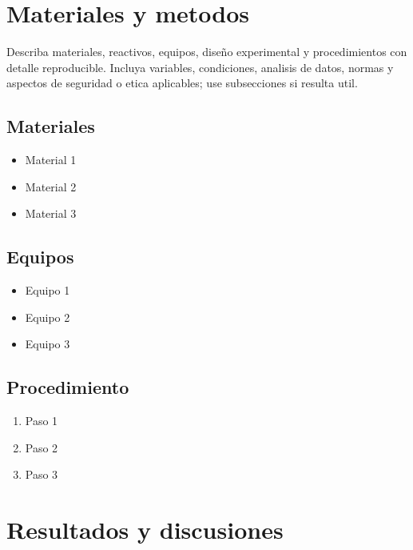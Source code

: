 \documentclass[11pt,a4paper]{article}
\begin{document}
\vspace{10pt}

\section{Materiales y metodos}

\begin{sectioncontent}
Describa materiales, reactivos, equipos, diseño experimental y procedimientos con detalle reproducible. Incluya variables, condiciones, analisis de datos, normas y aspectos de seguridad o etica aplicables; use subsecciones si resulta util.

\subsection*{Materiales}
\begin{itemize}
    \item Material 1
    \item Material 2
    \item Material 3
\end{itemize}

\subsection*{Equipos}
\begin{itemize}
    \item Equipo 1
    \item Equipo 2
    \item Equipo 3
\end{itemize}

\subsection*{Procedimiento}
\begin{enumerate}
    \item Paso 1
    \item Paso 2
    \item Paso 3
\end{enumerate}
\end{sectioncontent}

\vspace{10pt}

\section{Resultados y discusiones}
\end{document}
